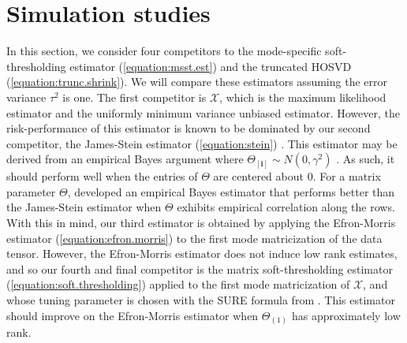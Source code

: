 \section{Simulation studies}
\label{sec:simulation}

 In this section, we consider four competitors to the mode-specific soft-thresholding estimator (\ref{equation:msst.est}) and the truncated HOSVD (\ref{equation:trunc.shrink}). We will compare these estimators assuming the error variance $\tau^2$ is one. The first competitor is $\mathcal{X}$, which is the maximum likelihood estimator and the uniformly minimum variance unbiased estimator. However, the risk-performance of this estimator is known to be dominated by our second competitor, the James-Stein estimator (\ref{equation:stein}) \citep{stein1981estimation}.
This estimator may be derived from an empirical Bayes argument where
$\Theta_{[\mathbf{i}]} \sim N(0,\gamma^2)$ \citep{efron1972limiting}. As such, it should perform
well when the entries of $\Theta$
are centered about $0$. For a matrix parameter $\Theta$, \cite{efron1972empirical} developed an empirical Bayes estimator that performs better than the James-Stein estimator when $\Theta$ exhibits empirical correlation along the rows. With this in mind, our third estimator is obtained by applying the Efron-Morris estimator (\ref{equation:efron.morris}) to the first mode matricization of the data tensor. However, the Efron-Morris estimator does not induce low rank estimates, and so our fourth and final competitor is the matrix soft-thresholding estimator
(\ref{equation:soft.thresholding}) applied to the first mode matricization of $\mathcal{X}$, and whose tuning parameter is chosen
with the SURE formula from \cite{candes2013unbiased}. This estimator should improve on the Efron-Morris estimator when $\Theta_{(1)}$ has approximately low rank.

